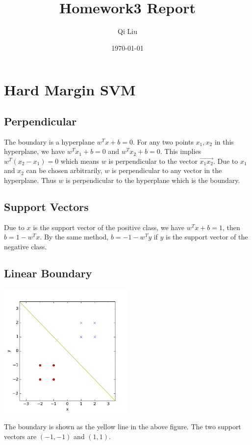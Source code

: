\documentclass{article}
\title{Homework3 Report}
\author{Qi Liu}
\date{\today}
\begin{document}
	
\maketitle

\section{Hard Margin SVM}

\subsection{Perpendicular}
The boundary is a hyperplane $w^Tx+b=0$. For any two points $x_1, x_2$ in this hyperplane, we have $w^Tx_1+b=0$ and $w^Tx_2+b=0$. This implies $w^T(x_2-x_1)=0$ which means $w$ is perpendicular to the vector $\overrightarrow{x_1x_2}$. Due to $x_1$ and $x_2$ can be chosen arbitrarily, $w$ is perpendicular to any vector in the hyperplane. Thus $w$ is perpendicular to the hyperplane which is the boundary.

\subsection{Support Vectors}
Due to $x$ is the support vector of the positive class, we have $w^Tx+b=1$, then $b=1-w^Tx$. By the same method, $b=-1-w^Ty$ if $y$ is the support vector of the negative class.

\subsection{Linear Boundary}
\begin{center}
\includegraphics[width=0.5\textwidth]{../result/linear_boundary.jpg}
\end{center}
The boundary is shown as the yellow line in the above figure. The two support vectors are $(-1,-1)$ and $(1, 1)$.
\end{document}
